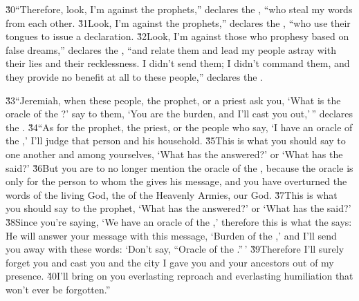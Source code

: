 \v{30}``Therefore, look, I'm against the prophets,'' declares the , ``who steal my words from each other. \v{31}Look, I'm against the prophets,'' declares the , ``who use their tongues to issue a declaration. \v{32}Look, I'm against those who prophesy based on false dreams,'' declares the , ``and relate them and lead my people astray with their lies and their recklessness. I didn't send them; I didn't command them, and they provide no benefit at all to these people,'' declares the .

\v{33}``Jeremiah, when these people, the prophet, or a priest ask you, `What is the oracle of the ?' say to them, `You are the burden, and I'll cast you out,'\,'' declares the . \v{34}``As for the prophet, the priest, or the people who say, `I have an oracle of the ,' I'll judge that person and his household. \v{35}This is what you should say to one another and among yourselves, `What has the  answered?' or `What has the  said?' \v{36}But you are to no longer mention the oracle of the , because the oracle is only for the person to whom the  gives his message, and you have overturned the words of the living God, the  of the Heavenly Armies, our God. \v{37}This is what you should say to the prophet, `What has the  answered?' or `What has the  said?' \v{38}Since you're saying, `We have an oracle of the ,' therefore this is what the  says: He will answer your message with this message, `Burden of the ,' and I'll send you away with these words: `Don't say, ``Oracle of the .''\,' \v{39}Therefore I'll surely forget you and cast you and the city I gave you and your ancestors out of my presence. \v{40}I'll bring on you everlasting reproach and everlasting humiliation that won't ever be forgotten.''

